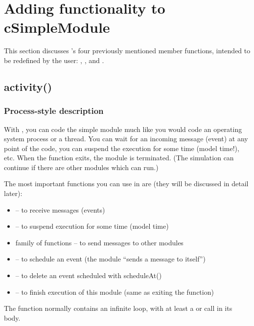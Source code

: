 \section{Adding functionality to cSimpleModule}

This section discusses 's four previously
mentioned member functions, intended to be redefined by the user:
, ,  and
.


\subsection{activity()}

\subsubsection{Process-style description}

With , you can code the simple
module much like you would code an operating system process or a
thread. You can wait for an incoming message (event) at any point of
the code, you can suspend the execution for some time (model time!),
etc. When the  function exits, the module is
terminated.  (The simulation can continue if there are other modules
which can run.)


The most important functions you can use in  are
(they will be discussed in detail later):
\begin{itemize}
\item{ -- to receive messages (events)}
\item{ -- to suspend execution
    for some time (model time)}
\item{ family of functions -- to send messages to other
    modules}
\item{ -- to schedule an event (the module ``sends
    a message to itself'')}
\item{ -- to delete an event scheduled with
    scheduleAt()}
\item{ -- to finish execution of this module (same as
    exiting the  function)}
\end{itemize}

The  function normally contains an infinite loop,
with at least a  or  call in its body.



